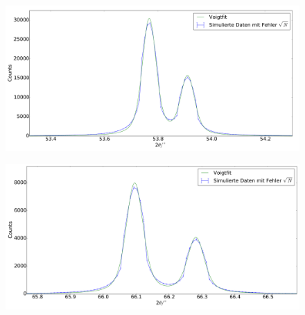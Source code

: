 \begin{figure}[H]
\begin{minipage}{.5\textwidth}
  \centering
  \includegraphics[scale=0.15]{Simulation_Germaniumpulver_3}
  \label{fig:pul_sim_ger_3}
\end{minipage}
\hspace{0.5cm}
\begin{minipage}{.5\textwidth}
  \centering
  \includegraphics[scale=0.15]{Simulation_Germaniumpulver_4}
  \label{fig:pul_sim_ger_4}
\end{minipage}
\end{figure}

